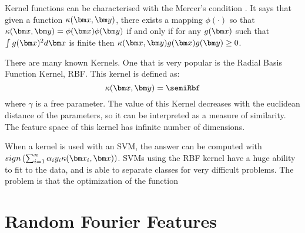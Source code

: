 \begin{pre-delivery}
Kernel functions can be characterised with the Mercer's condition
\cite{mercer1909functions}. It says that given a function $\kernel(\vx, \vy)$,
there exists a mapping $\phi(\cdot)$ so that
$\kernel(\vx, \vy) = \phi(\vx)\phi(\vy)$
if and only if for any $g(\vx)$ such that $\int g(\vx)^2 d\vx$ is finite then
$\kernel(\vx, \vy)g(\vx)g(\vy) \geq 0$.

There are many known Kernels. One that is very popular is the Radial Basis
Function Kernel, RBF. This kernel is defined as:
\begin{equation}
\kernel(\vx,\vy) = \semiRbf
\end{equation}
where $\gamma$ is a free parameter. The value of this Kernel decreases with the
euclidean distance of the parameters, so it can be interpreted as a measure
of similarity. The feature space of this kernel has infinite number of
dimensions.

When a kernel is used with an SVM, the answer can be computed with
$sign\left(\sum_{i = 1}^n \alpha_iy_i\kernel(\vx_i, \vx)\right)$.
SVMs using the RBF kernel have a huge ability to fit to the data, and is able
to separate classes for very difficult problems. The problem is that the
optimization of the function

\end{pre-delivery}

\section{Random Fourier Features}
\section{\Nys}
